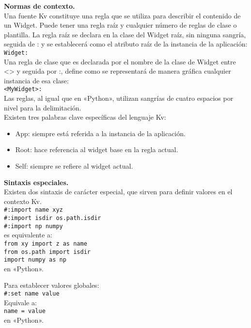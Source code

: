 \textbf{Normas de contexto.}\\
Una fuente Kv constituye una regla que se utiliza para describir el contenido de un Widget. Puede tener una regla raíz y cualquier número de reglas de clase o plantilla.
La regla raíz se declara en la clase del Widget raíz, sin ninguna sangría, seguida de : y se establecerá como el atributo raíz de la instancia de la aplicación:\\
\texttt{Widget:}\\
Una regla de clase que es declarada por el nombre de la clase de Widget entre <> y seguida por :, define como se representará de manera gráfica cualquier instancia de esa clase:\\
\texttt{<MyWidget>:}\\
Las reglas, al igual que en «Python», utilizan sangrías de cuatro espacios por nivel para la delimitación.\\
Existen tres palabras clave específicas del lenguaje Kv:
\begin{itemize}
\item App: siempre está referida a la instancia de la aplicación.
\item Root: hace referencia al widget base en la regla actual.
\item Self: siempre se refiere al widget actual.
\end{itemize}

\textbf{Sintaxis especiales.}\\
Existen dos sintaxis de carácter especial, que sirven para definir valores en el contexto Kv.\\
\texttt{\#:import name xyz\\
\#:import isdir os.path.isdir\\
\#:import np numpy}\\
es equivalente a:\\
\texttt{from xy import z as name\\
from os.path import isdir\\
import numpy as np}\\
en «Python».

Para establecer valores globales:\\
\texttt{\#:set name value}\\
Equivale a:\\
\texttt{name = value }\\
en «Python».\\





